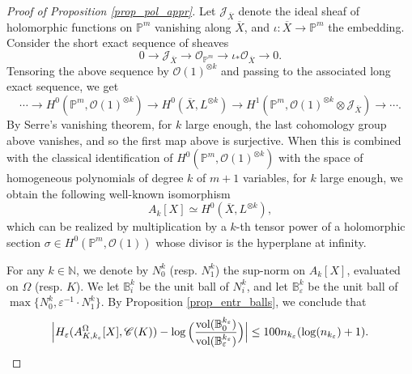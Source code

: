 \documentclass[12pt]{article}
\numberwithin{equation}{section}
\theoremstyle{theorem}
\theoremstyle{definition}
\theoremstyle{remark}
\newcommand{\nat}{\mathbb{N}}
\begin{document}
	\begin{proof}[Proof of Proposition \ref{prop_pol_appr}]
		Let $\mathcal{J}_{\overline{X}}$ denote the ideal sheaf of holomorphic functions on $\mathbb{P}^m$ vanishing along $\overline{X}$, and $\iota : \overline{X} \to \mathbb{P}^m$ the embedding.
		Consider the short exact sequence of sheaves
		\begin{equation}
			0 
			\rightarrow 
			\mathcal{J}_{\overline{X}} 
			\rightarrow
			\mathscr{O}_{\mathbb{P}^m} 
			\rightarrow
			\iota_* \mathscr{O}_{\overline{X}} 
			\rightarrow
			0.
		\end{equation}
		Tensoring the above sequence by $\mathscr{O}(1)^{\otimes k}$ and passing to the associated long exact sequence, we get
		\begin{equation}
			\cdots 
			\rightarrow 
			H^0(\mathbb{P}^m, \mathscr{O}(1)^{\otimes k})
			\rightarrow
			H^0(\overline{X}, L^{\otimes k})
			\rightarrow
			H^1(\mathbb{P}^m, \mathscr{O}(1)^{\otimes k} \otimes \mathcal{J}_{\overline{X}})
			\rightarrow
			\cdots.
		\end{equation}
		By Serre's vanishing theorem, for $k$ large enough, the last cohomology group above vanishes, and so the first map above is surjective.
		When this is combined with the classical identification of $H^0(\mathbb{P}^m, \mathscr{O}(1)^{\otimes k})$ with the space of homogeneous polynomials of degree $k$ of $m + 1$ variables, for $k$ large enough, we obtain the following well-known isomorphism
		\begin{equation}
			A_k[X] \simeq H^0(\overline{X}, L^{\otimes k}),
		\end{equation}
		which can be realized by multiplication by a $k$-th tensor power of a holomorphic section $\sigma \in H^0(\mathbb{P}^m, \mathscr{O}(1))$ whose divisor is the hyperplane at infinity.
		\par 
		For any $k \in \nat$, we denote by $N_0^k$ (resp. $N_1^k$) the sup-norm on $A_k[X]$, evaluated on $\Omega$ (resp. $K$).
		We let $\mathbb{B}_{i}^k$ be the unit ball of $N_i^k$, and let $\mathbb{B}_{\varepsilon}^k$ be the unit ball of $\max \{ N_0^k, \varepsilon^{-1} \cdot N_1^k \}$.
		By Proposition \ref{prop_entr_balls}, we conclude that 
		\begin{equation}\label{eq_entr_appr_1}
			\Big|
			H_{\varepsilon}(A_{K, k_{\varepsilon}}^{\Omega}[X], \mathscr{C}(K))
			-
			\log \Big( \frac{{\rm{vol}}(\mathbb{B}_{0}^{k_{\varepsilon}})}{{\rm{vol}}(\mathbb{B}_{\varepsilon}^{k_{\varepsilon}})} \Big)
			\Big|
			\leq
			100 n_{k_{\varepsilon}} (\log(n_{k_{\varepsilon}}) + 1).

\end{equation}
\end{proof}
\end{document}

